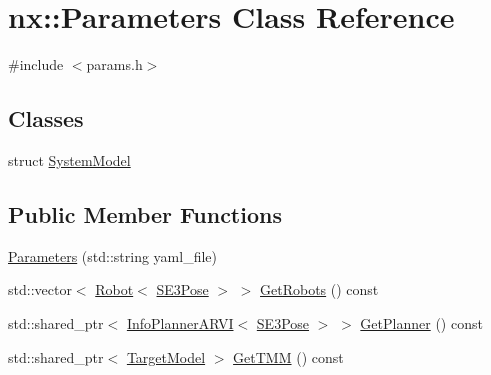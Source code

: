 \hypertarget{classnx_1_1Parameters}{}\section{nx\+:\+:Parameters Class Reference}
\label{classnx_1_1Parameters}


{\ttfamily \#include $<$params.\+h$>$}

\subsection*{Classes}
\begin{DoxyCompactItemize}
\item 
struct \hyperlink{structnx_1_1Parameters_1_1SystemModel}{System\+Model}
\end{DoxyCompactItemize}
\subsection*{Public Member Functions}
\begin{DoxyCompactItemize}
\item 
\hyperlink{classnx_1_1Parameters_a40831f91ab8503eceb16026baed0892f}{Parameters} (std\+::string yaml\+\_\+file)
\item 
std\+::vector$<$ \hyperlink{classnx_1_1Robot}{Robot}$<$ \hyperlink{structnx_1_1SE3Pose}{S\+E3\+Pose} $>$ $>$ \hyperlink{classnx_1_1Parameters_ac58789b10f6377ae6e0b55c98015c147}{Get\+Robots} () const
\item 
std\+::shared\+\_\+ptr$<$ \hyperlink{classnx_1_1InfoPlannerARVI}{Info\+Planner\+A\+R\+VI}$<$ \hyperlink{structnx_1_1SE3Pose}{S\+E3\+Pose} $>$ $>$ \hyperlink{classnx_1_1Parameters_aabae7ec0743096b9980264f6613e961e}{Get\+Planner} () const
\item 
std\+::shared\+\_\+ptr$<$ \hyperlink{classnx_1_1TargetModel}{Target\+Model} $>$ \hyperlink{classnx_1_1Parameters_a68fdc4f85de0a03a9ba56bdd99da45c7}{Get\+T\+MM} () const
\end{DoxyCompactItemize}
